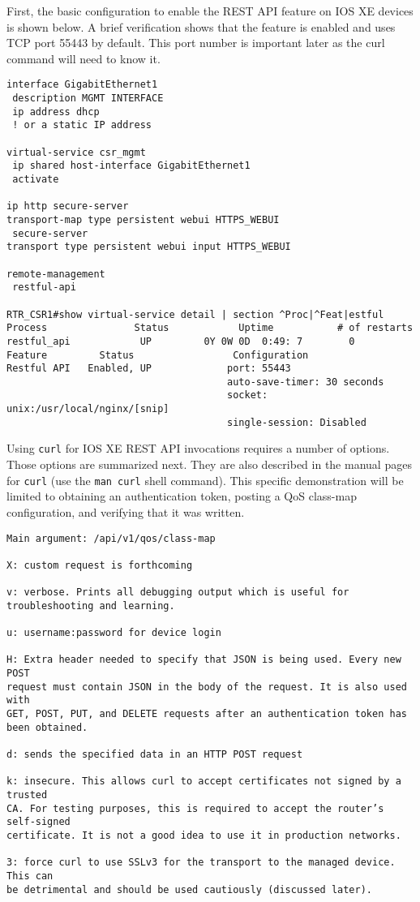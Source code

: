 First, the basic configuration to enable the REST API feature on IOS XE
devices is shown below. A brief verification shows that the feature is enabled
and uses TCP port 55443 by default. This port number is important later as the
curl command will need to know it.

\begin{verbatim}
interface GigabitEthernet1
 description MGMT INTERFACE
 ip address dhcp
 ! or a static IP address

virtual-service csr_mgmt
 ip shared host-interface GigabitEthernet1
 activate

ip http secure-server
transport-map type persistent webui HTTPS_WEBUI
 secure-server
transport type persistent webui input HTTPS_WEBUI

remote-management
 restful-api

RTR_CSR1#show virtual-service detail | section ^Proc|^Feat|estful  
Process               Status            Uptime           # of restarts
restful_api            UP         0Y 0W 0D  0:49: 7        0
Feature         Status                 Configuration
Restful API   Enabled, UP             port: 55443
                                      auto-save-timer: 30 seconds
                                      socket: unix:/usr/local/nginx/[snip]
                                      single-session: Disabled
\end{verbatim}

Using \verb|curl| for IOS XE REST API invocations requires a number of options. Those
options are summarized next. They are also described in the manual pages for
\verb|curl| (use the \verb|man curl| shell command). This specific
demonstration will be limited to obtaining an authentication token, posting a
QoS class-map configuration, and verifying that it was written.

\begin{verbatim}
Main argument: /api/v1/qos/class-map

X: custom request is forthcoming

v: verbose. Prints all debugging output which is useful for troubleshooting and learning.

u: username:password for device login

H: Extra header needed to specify that JSON is being used. Every new POST
request must contain JSON in the body of the request. It is also used with
GET, POST, PUT, and DELETE requests after an authentication token has been obtained.

d: sends the specified data in an HTTP POST request

k: insecure. This allows curl to accept certificates not signed by a trusted
CA. For testing purposes, this is required to accept the router’s self-signed
certificate. It is not a good idea to use it in production networks.

3: force curl to use SSLv3 for the transport to the managed device. This can
be detrimental and should be used cautiously (discussed later).
\end{verbatim}

